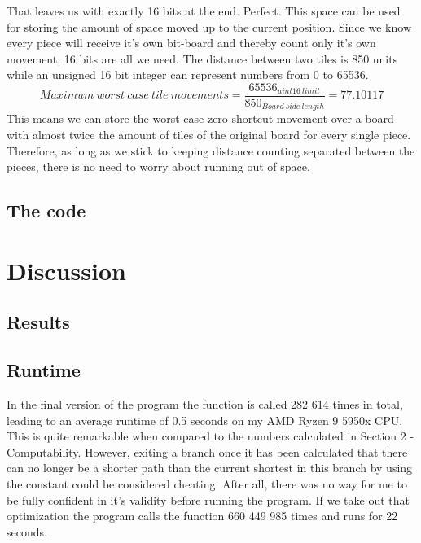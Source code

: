 \documentclass[12pt]{article} %
\begin{document}
That leaves us with exactly 16 bits at the end. Perfect. This space can be used for storing the amount of space moved up to the current position. Since we know every piece will receive it's own bit-board and thereby count only it's own movement, 16 bits are all we need. The distance between two tiles is 850 units while an unsigned 16 bit integer can represent numbers from 0 to 65536.
\[
    Maximum~worst~case~tile ~movements = \frac{65536_{uint16~limit}}{850_{Board~side~length}} = 77.10117
\]
This means we can store the worst case zero shortcut movement over a board with almost twice the amount of tiles of the original board for every single piece. Therefore, as long as we stick to keeping distance counting separated between the pieces, there is no need to worry about running out of space.

\subsection{The code}


\section{Discussion}

\subsection{Results}

\subsection{Runtime}
In the final version of the program the  function is called  282 614 times in total, leading to an average runtime of 0.5 seconds on my AMD Ryzen 9 5950x CPU. This is quite remarkable when compared to the numbers calculated in Section 2 - Computability. However, exiting a branch once it has been calculated that there can no longer be a shorter path than the current shortest in this branch by using the   constant could be considered cheating. After all, there was no way for me to be fully confident in it's validity before running the program.
If we take out that optimization the program calls the function 660 449 985 times and runs for 22 seconds.
\end{document}
